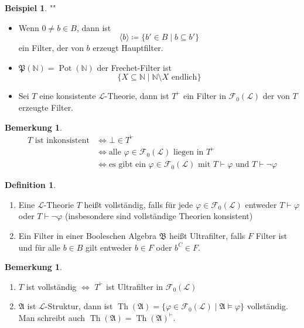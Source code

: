 \documentclass[12pt,parskip=full]{scrartcl}
\newcommand{\setN}{\mathbb{N}}
\theoremstyle{definition}
\newtheorem{definition}[theorem]{Definition}
\newtheorem{example}[theorem]{Beispiel}
\newtheorem{remark}[theorem]{Bemerkung}
\begin{document}
	\begin{example}""
		\begin{itemize}
			\item Wenn $0 \neq b \in B$, dann ist
			\begin{equation*}
				\langle b \rangle \coloneqq \{ b' \in B \mid b \subseteq b' \}
			\end{equation*}
			ein Filter, der von $b$ erzeugt Hauptfilter.
			\item $\mathfrak{P}(\setN) = \operatorname{Pot}(\setN)$ der Frechet-Filter ist
			\begin{equation*}
				\{ X \subseteq \setN \mid \setN \setminus X \text{ endlich} \}
			\end{equation*}
			\item Sei $T$ eine konsistente $\mathcal{L}$-Theorie, dann ist $T^\vdash$ ein Filter in $\mathcal{F}_0(\mathcal{L})$ der von $T$ erzeugte Filter.
		\end{itemize}
	\end{example}

	\begin{remark}
		\begin{align*}
			\text{$T$ ist inkonsistent} &\Longleftrightarrow \bot \in T^\vdash \\
			&\Longleftrightarrow \text{alle $\varphi \in \mathcal{F}_0(\mathcal{L})$ liegen in $T^\vdash$} \\
			&\Longleftrightarrow \text{es gibt ein $\varphi \in \mathcal{F}_0(\mathcal{L})$ mit $T \vdash \varphi$ und $T \vdash \lnot \varphi$}
		\end{align*}
	\end{remark}

	\begin{definition}
		\begin{enumerate}
			\item Eine $\mathcal{L}$-Theorie $T$ heißt vollständig, falls für jede $\varphi \in \mathcal{F}_0(\mathcal{L})$ entweder $T \vdash \varphi$ oder $T \vdash \lnot \varphi$ (insbesondere sind vollständige Theorien konsistent)
			\item Ein Filter in einer Booleschen Algebra $\mathfrak{B}$ heißt Ultrafilter, falls $F$ Filter ist und für alle $b \in B$ gilt entweder $b \in F$ oder $b^C \in F$.
		\end{enumerate}
	\end{definition}

	\begin{remark}
		\begin{enumerate}
			\item $T$ ist vollständig $\Leftrightarrow$ $T^\vdash$ ist Ultrafilter in $\mathcal{F}_0(\mathcal{L})$
			\item $\mathfrak{A}$ ist $\mathcal{L}$-Struktur, dann ist $\operatorname{Th}(\mathfrak{A}) = \{ \varphi \in \mathcal{F}_0(\mathcal{L}) \mid \mathfrak{A} \models \varphi \}$ vollständig. Man schreibt auch $\operatorname{Th}(\mathfrak{A}) = \operatorname{Th}(\mathfrak{A})^\vdash$.
		\end{enumerate}
	\end{remark}
\end{document}

